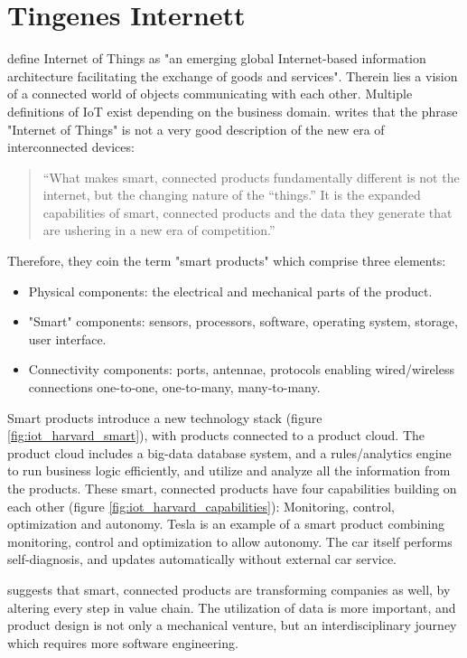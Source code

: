 \section{Tingenes Internett}
\citet{iot_legal} define Internet of Things as "an emerging global
Internet-based information architecture facilitating the exchange of
goods and services". Therein lies a vision of a connected world of objects
communicating with each other. Multiple definitions of IoT exist depending on the business domain.
\citet{iot_harvard_smart} writes that the phrase "Internet of Things" is not a very good description
of the new era of interconnected devices:

\blockquote{\enquote{What makes smart, connected products fundamentally different is not the internet,
but the changing nature of the “things.” It is the expanded capabilities of smart, connected
products and the data they generate that are ushering in a new era of competition.}}

Therefore, they coin the term "smart products" which comprise three elements:

\begin{itemize}
    \item Physical components: the electrical and mechanical parts of the product.
    \item "Smart" components: sensors, processors, software, operating system, storage, user interface.
    \item Connectivity components: ports, antennae, protocols enabling wired/wireless connections
    one-to-one, one-to-many, many-to-many.
\end{itemize}
Smart products introduce a new technology stack (figure \ref{fig:iot_harvard_smart}), with products connected to a product cloud.
The product cloud includes a big-data database system, and a rules/analytics engine to run business logic efficiently,
and utilize and analyze all the information from the products. These smart, connected products have four capabilities building
on each other (figure \ref{fig:iot_harvard_capabilities}): Monitoring, control, optimization and autonomy.
Tesla is an example of a smart product combining monitoring, control and optimization to allow autonomy. The car itself performs
self-diagnosis, and updates automatically without external car service.

\citet{iot_harvard_smartcompanies} suggests that smart, connected products are transforming companies as well, by altering
every step in value chain. The utilization of data is more important, and product design is not only a mechanical venture,
but an interdisciplinary journey which requires more software engineering.

